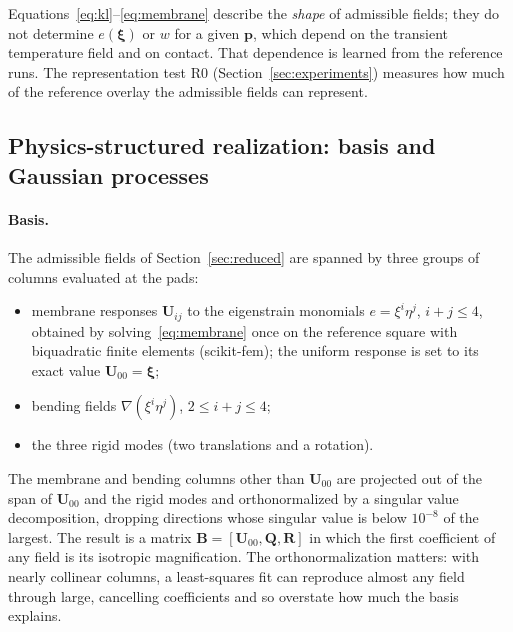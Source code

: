 \documentclass[11pt]{article}
\begin{document}
Equations~\eqref{eq:kl}--\eqref{eq:membrane} describe the \emph{shape} of admissible fields; they do not determine
$e(\boldsymbol\xi)$ or $w$ for a given $\mathbf{p}$, which depend on the transient temperature field and on contact.
That dependence is learned from the reference runs. The representation test R0 (Section~\ref{sec:experiments}) measures how much of the reference overlay
the admissible fields can represent.

\subsection{Physics-structured realization: basis and Gaussian processes}\label{sec:basis}
\paragraph{Basis.} The admissible fields of Section~\ref{sec:reduced} are spanned by three groups of columns evaluated at
the pads:
\begin{itemize}
  \item membrane responses $\mathbf{U}_{ij}$ to the eigenstrain monomials $e=\xi^i\eta^j$, $i+j\le4$, obtained by
        solving~\eqref{eq:membrane} once on the reference square with biquadratic finite elements (scikit-fem);
        the uniform response is set to its exact value $\mathbf{U}_{00}=\boldsymbol\xi$;
  \item bending fields $\nabla(\xi^i\eta^j)$, $2\le i+j\le4$;
  \item the three rigid modes (two translations and a rotation).
\end{itemize}
The membrane and bending columns other than $\mathbf{U}_{00}$ are projected out of the span of $\mathbf{U}_{00}$ and the
rigid modes and orthonormalized by a singular value decomposition, dropping directions whose singular value is below
$10^{-8}$ of the largest. The result is a matrix $\mathbf{B}=[\mathbf{U}_{00},\mathbf{Q},\mathbf{R}]$ in which the first
coefficient of any field is its isotropic magnification. The orthonormalization matters: with nearly collinear columns,
a least-squares fit can reproduce almost any field through large, cancelling coefficients and so overstate how much
the basis explains.
\end{document}
